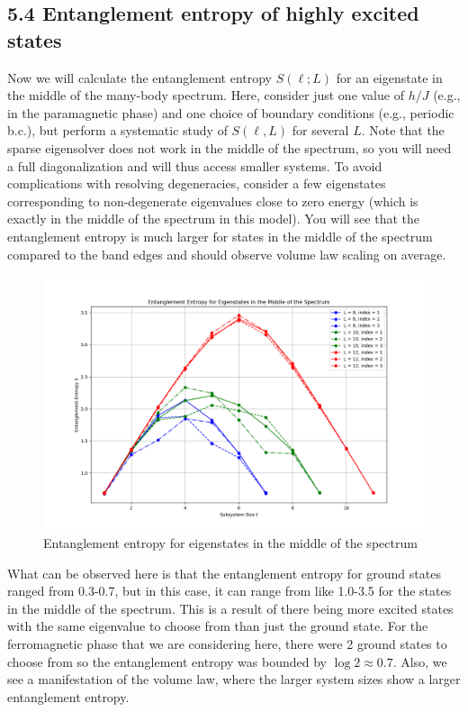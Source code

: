 \documentclass[12pt]{article}
\begin{document}
\subsection*{5.4 Entanglement entropy of highly excited states}
Now we will calculate the entanglement entropy $S(\ell; L)$ for an eigenstate in the middle of the many-body spectrum. Here, consider just one value of $h/J$ (e.g., in the paramagnetic phase) and one choice of boundary conditions (e.g., periodic b.c.), but perform a systematic study of $S(\ell, L)$ for several $L$. Note that the sparse eigensolver does not work in the middle of the spectrum, so you will need a full diagonalization and will thus access smaller systems. To avoid complications with resolving degeneracies, consider a few eigenstates corresponding to non-degenerate eigenvalues close to zero energy (which is exactly in the middle of the spectrum in this model). You will see that the entanglement entropy is much larger for states in the middle of the spectrum compared to the band edges and should observe volume law scaling on average.\\
\begin{figure}[h]
\centering
\includegraphics[width=\textwidth]{entanglement_entropy_middle_spectrum.png}
\caption{Entanglement entropy for eigenstates in the middle of the spectrum}
\end{figure}
What can be observed here is that the entanglement entropy for ground states ranged from 0.3-0.7, but in this case, it can range from like 1.0-3.5 for the states in the middle of the spectrum. This is a result of there being more excited states with the same eigenvalue to choose from than just the ground state. For the ferromagnetic phase that we are considering here, there were 2 ground states to choose from so the entanglement entropy was bounded by $\log 2 \approx 0.7$. Also, we see a manifestation of the volume law, where the larger system sizes show a larger entanglement entropy.
\end{document}
